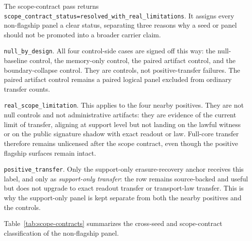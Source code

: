 \documentclass[11pt]{article}
\theoremstyle{definition}
\begin{document}
The scope-contract pass returns
\texttt{scope\_contract\_status=resolved\_with\_real\_limitations}. It assigns every
non-flagship panel a clear status, separating three reasons why a seed or panel should
not be promoted into a broader carrier claim.

\texttt{null\_by\_design}. All four control-side cases are signed off this way: the
null-baseline control, the memory-only control, the paired artifact control, and the
boundary-collapse control. They are controls, not positive-transfer failures. The
paired artifact control remains a paired logical panel excluded from ordinary transfer
counts.

\texttt{real\_scope\_limitation}. This applies to the four nearby positives. They are
not null controls and not administrative artifacts: they are evidence of the current
limit of transfer, aligning at support level but not landing on the lawful witness or
on the public signature shadow with exact readout or law. Full-core transfer therefore
remains unlicensed after the scope contract, even though the positive flagship
surfaces remain intact.

\texttt{positive\_transfer}. Only the support-only erasure-recovery anchor receives
this label, and only as \emph{support-only transfer}: the row remains source-backed
and useful but does not upgrade to exact readout transfer or transport-law transfer.
This is why the support-only panel is kept separate from both the nearby positives and
the controls.

Table~\ref{tab:scope-contracts} summarizes the cross-seed and scope-contract classification
of the non-flagship panel.
\end{document}
